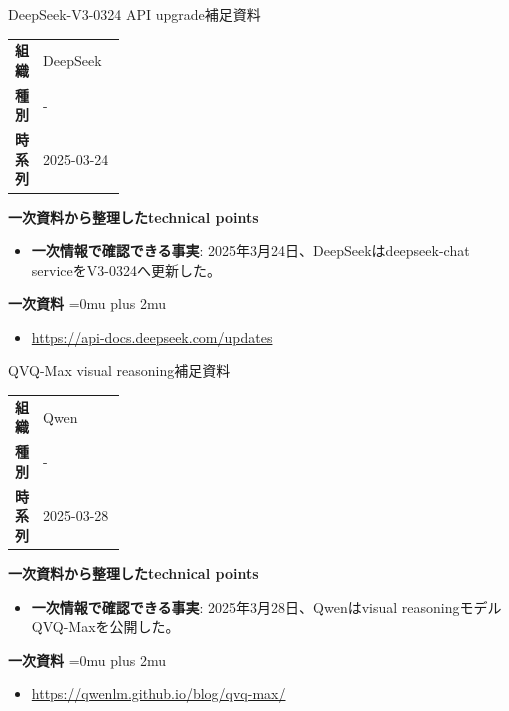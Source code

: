 \begin{technicalnote}{DeepSeek-V3-0324 API upgrade}{補足資料}
\begingroup
\begin{tabularx}{\linewidth}{@{}>{\bfseries}p{0.22\linewidth}X@{}}
組織 & DeepSeek \\
種別 & - \\
時系列 & 2025-03-24 \\
\end{tabularx}
\smallskip
{\bfseries 一次資料から整理したtechnical points}
\begin{itemize}[leftmargin=1.5em,itemsep=0.35em]
\item \textbf{一次情報で確認できる事実}: 2025年3月24日、DeepSeekはdeepseek-chat serviceをV3-0324へ更新した。
\end{itemize}
\begin{samepage}
{\bfseries 一次資料}
\begingroup\sloppy
\Urlmuskip=0mu plus 2mu\relax
\begin{itemize}[leftmargin=1.5em,itemsep=0.25em]
\item {\scriptsize\url{https://api-docs.deepseek.com/updates}}
\end{itemize}
\endgroup
\end{samepage}
\endgroup
\end{technicalnote}
\medskip

\begin{technicalnote}{QVQ-Max visual reasoning}{補足資料}
\begingroup
\begin{tabularx}{\linewidth}{@{}>{\bfseries}p{0.22\linewidth}X@{}}
組織 & Qwen \\
種別 & - \\
時系列 & 2025-03-28 \\
\end{tabularx}
\smallskip
{\bfseries 一次資料から整理したtechnical points}
\begin{itemize}[leftmargin=1.5em,itemsep=0.35em]
\item \textbf{一次情報で確認できる事実}: 2025年3月28日、Qwenはvisual reasoningモデルQVQ-Maxを公開した。
\end{itemize}
\begin{samepage}
{\bfseries 一次資料}
\begingroup\sloppy
\Urlmuskip=0mu plus 2mu\relax
\begin{itemize}[leftmargin=1.5em,itemsep=0.25em]
\item {\scriptsize\url{https://qwenlm.github.io/blog/qvq-max/}}
\end{itemize}
\endgroup
\end{samepage}
\endgroup
\end{technicalnote}
\medskip
